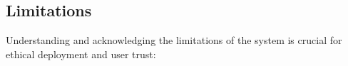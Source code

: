 
\subsection{Limitations}\label{subsec:limitations}
Understanding and acknowledging the limitations of the system is crucial for ethical deployment and user trust:

